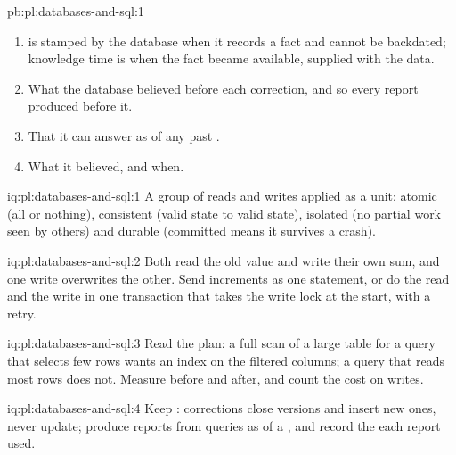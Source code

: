 \begin{solution}{pb:pl:databases-and-sql:1}
\begin{enumerate}
Tuesday 18:00) and differs from the corrected report (system Friday) on 48 of 10\,000 positions, one per correction: 30 quantities, 10
cancellations and 8 late bookings. The (account, instrument) index speeds the point query about a thousandfold (13.7~ms to 0.01~ms); the
valid-time index gains almost nothing on any query.
\item {} is stamped by the database when it records a fact and cannot be backdated; knowledge time is when the fact became available,
supplied with the data.
\item What the database believed before each correction, and so every report produced before it.
\item That it can answer as of any past .
\item What it believed, and when.
\end{enumerate}
\end{solution}

\begin{solution}{iq:pl:databases-and-sql:1}
A group of reads and writes applied as a unit: atomic (all or nothing), consistent (valid state to valid state), isolated (no partial work
seen by others) and durable (committed means it survives a crash).
\end{solution}

\begin{solution}{iq:pl:databases-and-sql:2}
Both read the old value and write their own sum, and one write overwrites the other. Send increments as one statement, or do the read and the
write in one transaction that takes the write lock at the start, with a retry.
\end{solution}

\begin{solution}{iq:pl:databases-and-sql:3}
Read the plan: a full scan of a large table for a query that selects few rows wants an index on the filtered columns; a query that reads most
rows does not. Measure before and after, and count the cost on writes.
\end{solution}

\begin{solution}{iq:pl:databases-and-sql:4}
Keep : corrections close versions and insert new ones, never update; produce reports from queries as of a , and record
the  each report used.
\end{solution}

